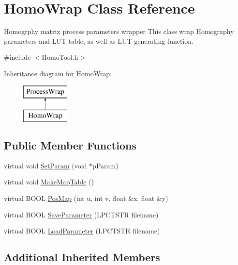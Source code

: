 \hypertarget{class_homo_wrap}{}\section{Homo\+Wrap Class Reference}
\label{class_homo_wrap}


Homogrphy matrix process parameters wrapper This class wrap Homography parameters and L\+UT table, as well as L\+UT generating function.  




{\ttfamily \#include $<$Homo\+Tool.\+h$>$}

Inheritance diagram for Homo\+Wrap\+:\begin{figure}[H]
\begin{center}
\leavevmode
\includegraphics[height=2.000000cm]{class_homo_wrap}
\end{center}
\end{figure}
\subsection*{Public Member Functions}
\begin{DoxyCompactItemize}
\item 
virtual void \mbox{\hyperlink{class_homo_wrap_aecc7d5180e979679ad9e41ceaa846d05}{Set\+Param}} (void $\ast$p\+Param)
\item 
virtual void \mbox{\hyperlink{class_homo_wrap_a04c5506434d9afe322bfd6c08c51868f}{Make\+Map\+Table}} ()
\item 
virtual B\+O\+OL \mbox{\hyperlink{class_homo_wrap_a028ad1fea13805568dbe891f51dec7b2}{Pos\+Map}} (int u, int v, float \&x, float \&y)
\item 
virtual B\+O\+OL \mbox{\hyperlink{class_homo_wrap_aafd5595ef17a6be3074186204c39a550}{Save\+Parameter}} (L\+P\+C\+T\+S\+TR filename)
\item 
virtual B\+O\+OL \mbox{\hyperlink{class_homo_wrap_a5409cdfe65bc28ec3779f35eb3af22b4}{Load\+Parameter}} (L\+P\+C\+T\+S\+TR filename)
\end{DoxyCompactItemize}
\subsection*{Additional Inherited Members}


